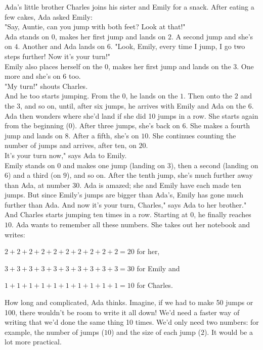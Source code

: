 Ada's little brother Charles joins his sister and Emily for a snack. After eating a few cakes, Ada asked Emily:\\
"Say, Auntie, can you jump with both feet? Look at that!"\\
Ada stands on $0$, makes her first jump and lands on $2$. A second jump and she's on $4$. Another and Ada lands on $6$.
"Look, Emily, every time I jump, I go two steps further! Now it's your turn!"\\
Emily also places herself on the $0$, makes her first jump and lands on the $3$. One more and she's on $6$ too.\\
"My turn!" shouts Charles.\\
And he too starts jumping. From the $0$, he lands on the $1$. Then onto the $2$ and the $3$, and so on, until, after six jumps, he arrives with Emily and Ada on the $6$.
Ada then wonders where she'd land if she did 10 jumps in a row. 
She starts again from the beginning ($0$). After three jumps, she's back on $6$. 
She makes a fourth jump and lands on $8$. 
After a fifth, she's on $10$. She continues counting the number of jumps and arrives, after ten, on $20$.\\
It's your turn now," says Ada to Emily.\\
Emily stands on $0$ and makes one jump (landing on $3$), then a second (landing on $6$) and a third (on $9$), and so on. After the tenth jump, she's much further away than Ada, at number $30$.
Ada is amazed; she and Emily have each made ten jumps. But since Emily's jumps are bigger than Ada's, Emily has gone much further than Ada. 
And now it's your turn, Charles," says Ada to her brother."\\
And Charles starts jumping ten times in a row. Starting at $0$, he finally reaches $10$.
Ada wants to remember all these numbers. She takes out her notebook and writes:
\begin{description}[leftmargin=0.5cm]
    \item $2+2+2+2+2+2+2+2+2+2=20$ for her,
    \item $3+3+3+3+3+3+3+3+3+3=30$ for Emily and
    \item $1+1+1+1+1+1+1+1+1+1=10$ for Charles.
\end{description}
How long and complicated, Ada thinks. 
Imagine, if we had to make 50 jumps or 100, there wouldn't be room to write it all down! 
We'd need a faster way of writing that we'd done the same thing 10 times. We'd only need two numbers: for example, the number of jumps ($10$) and the size of each jump ($2$). It would be a lot more practical. 
